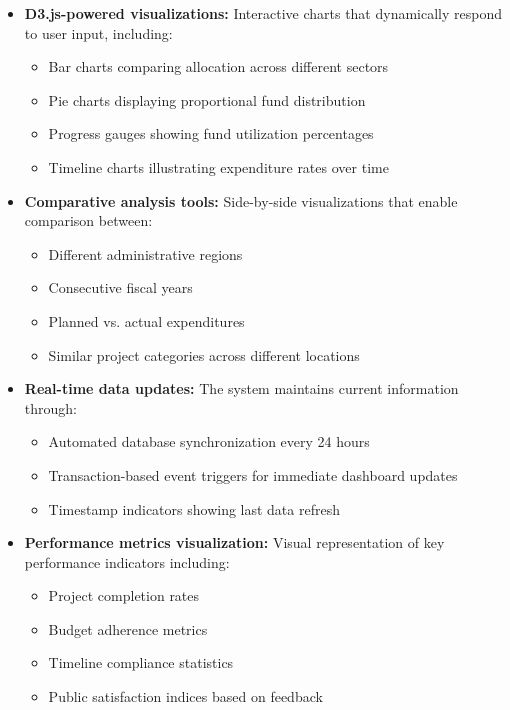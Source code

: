 \documentclass[12pt,a4paper]{report}
\begin{document}
\begin{itemize}
    \item \textbf{D3.js-powered visualizations:} Interactive charts that dynamically respond to user input, including:
    \begin{itemize}
        \item Bar charts comparing allocation across different sectors
        \item Pie charts displaying proportional fund distribution
        \item Progress gauges showing fund utilization percentages
        \item Timeline charts illustrating expenditure rates over time
    \end{itemize}
    
    \item \textbf{Comparative analysis tools:} Side-by-side visualizations that enable comparison between:
    \begin{itemize}
        \item Different administrative regions
        \item Consecutive fiscal years
        \item Planned vs. actual expenditures
        \item Similar project categories across different locations
    \end{itemize}
    
    \item \textbf{Real-time data updates:} The system maintains current information through:
    \begin{itemize}
        \item Automated database synchronization every 24 hours
        \item Transaction-based event triggers for immediate dashboard updates
        \item Timestamp indicators showing last data refresh
    \end{itemize}
    
    \item \textbf{Performance metrics visualization:} Visual representation of key performance indicators including:
    \begin{itemize}
        \item Project completion rates
        \item Budget adherence metrics
        \item Timeline compliance statistics
        \item Public satisfaction indices based on feedback
    \end{itemize}
\end{itemize}
\end{document}
